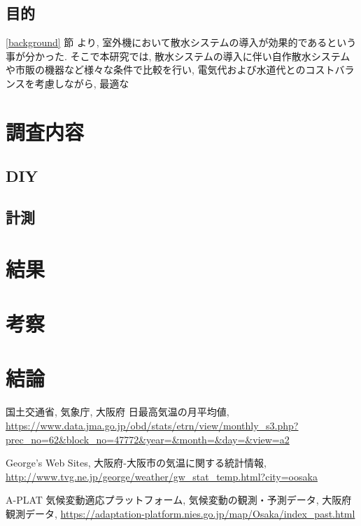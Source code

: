 \documentclass[a4j,fleqn,dvipdfmx,uplatex]{jsarticle}
\newcommand{\subsecref}[1]{\ref{#1}\hspace{0.2zw} 節}
\begin{document}
\subsection{目的}\label{purpose}
\subsecref{background} より, 室外機において散水システムの導入が効果的であるという事が分かった. 
そこで本研究では, 散水システムの導入に伴い自作散水システムや市販の機器など様々な条件で比較を行い, 
電気代および水道代とのコストバランスを考慮しながら, 最適な

\section{調査内容}\label{sec2}

\subsection{DIY}\label{subsec:apriltag}

\subsection{計測}\label{subsec:tag_pos}



\section{結果}\label{sec3}

\section{考察}


\section{結論}


\begin{thebibliography}{99}
国土交通省, 気象庁, 大阪府 日最高気温の月平均値, 
\url{https://www.data.jma.go.jp/obd/stats/etrn/view/monthly_s3.php?prec_no=62&block_no=47772&year=&month=&day=&view=a2}\vspace{2mm}

George's Web Sites, 大阪府-大阪市の気温に関する統計情報, 
\url{http://www.tvg.ne.jp/george/weather/gw_stat_temp.html?city=oosaka}\vspace{2mm}

A-PLAT 気候変動適応プラットフォーム, 気候変動の観測・予測データ, 大阪府観測データ, 
\url{https://adaptation-platform.nies.go.jp/map/Osaka/index_past.html}\vspace{2mm}
\end{thebibliography}
%
%
%
\end{document}
